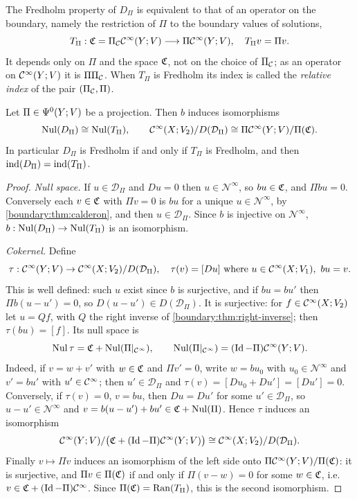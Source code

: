 The Fredholm property of $D_\Pi$ is equivalent to that of an operator on the boundary,
namely the restriction of $\Pi$ to the boundary values of solutions,
\begin{equation}\label{boundary:eq:T-Pi}
T_\Pi:\mathfrak{C}=\Pi_{\mathcal{C}}\mathcal{C}^\infty(Y;V)\longrightarrow\Pi\mathcal{C}^\infty(Y;V),\quad T_\Pi v=\Pi v.
\end{equation}
It depends only on $\Pi$ and the space $\mathfrak{C}$, not on the choice of $\Pi_{\mathcal{C}}$; as an operator
on $\mathcal{C}^\infty(Y;V)$ it is $\Pi\Pi_{\mathcal{C}}$. When $T_\Pi$ is Fredholm its index is called the
\emph{relative index} of the pair $(\Pi_{\mathcal{C}},\Pi)$.

\begin{theorem}\label{boundary:thm:fredholm-bc}
Let $\Pi\in\Psi^{0}(Y;V)$ be a projection. Then $b$ induces isomorphisms
\begin{equation*}
\operatorname{Nul}(D_\Pi)\cong\operatorname{Nul}(T_\Pi),\qquad \mathcal{C}^\infty(X;V_2)/D(\mathcal D_\Pi)\cong\Pi\mathcal{C}^\infty(Y;V)/
\Pi(\mathfrak{C}).
\end{equation*}
In particular $D_\Pi$ is Fredholm if and only if $T_\Pi$ is Fredholm, and then
$\operatorname{ind}(D_\Pi)=\operatorname{ind}(T_\Pi)$.
\end{theorem}
\begin{proof}
\emph{Null space.} If $u\in\mathcal{D}_\Pi$ and $Du=0$ then $u\in\mathcal{N}^\infty$, so
$bu\in\mathfrak{C}$, and $\Pi bu=0$. Conversely each $v\in\mathfrak{C}$ with $\Pi v=0$ is $bu$ for a
unique $u\in\mathcal{N}^\infty$, by \cref{boundary:thm:calderon}, and then $u\in
\mathcal{D}_\Pi$. Since $b$ is injective on $\mathcal{N}^\infty$, $b:\operatorname{Nul}(D_\Pi)\to
\operatorname{Nul}(T_\Pi)$ is an isomorphism.

\emph{Cokernel.} Define
\begin{equation*}
\tau:\CI(Y;V)\to\CI(X;V_2)/D(\mathcal{D}_\Pi),\quad\tau(v)=[Du]\ \text{where}\
u\in\CI(X;V_1),\ bu=v.
\end{equation*}
This is well defined: such $u$ exist since $b$ is surjective, and if $bu=bu'$ then
$\Pi b(u-u')=0$, so $D(u-u')\in D(\mathcal{D}_\Pi)$. It is surjective: for $f\in
\mathcal{C}^\infty(X;V_2)$ let $u=Qf$, with $Q$ the right inverse of \cref{boundary:thm:right-inverse};
then $\tau(bu)=[f]$. Its null space is
\begin{equation*}
\operatorname{Nul}\tau=\mathfrak{C}+\operatorname{Nul}(\Pi|_{\mathcal{C}^\infty}),\qquad \operatorname{Nul}(\Pi|_{\mathcal{C}^\infty})=(\operatorname{Id}-\Pi)\mathcal{C}^\infty(Y;V).
\end{equation*}
Indeed, if $v=w+v'$ with $w\in\mathfrak{C}$ and $\Pi v'=0$, write $w=bu_0$ with $u_0\in
\mathcal{N}^\infty$ and $v'=bu'$ with $u'\in\mathcal{C}^\infty$; then $u'\in\mathcal{D}_\Pi$ and
$\tau(v)=[Du_0+Du']=[Du']=0$. Conversely, if $\tau(v)=0$, $v=bu$, then $Du=Du'$ for some
$u'\in\mathcal{D}_\Pi$, so $u-u'\in\mathcal{N}^\infty$ and $v=b(u-u')+bu'\in\mathfrak{C}+
\operatorname{Nul}(\Pi)$. Hence $\tau$ induces an isomorphism
\begin{equation*}
\mathcal{C}^\infty(Y;V)/\big(\mathfrak{C}+(\operatorname{Id}-\Pi)\mathcal{C}^\infty(Y;V)\big)\cong\mathcal{C}^\infty(X;V_2)/D(\mathcal{D}_\Pi).
\end{equation*}
Finally $v\mapsto\Pi v$ induces an isomorphism of the left side onto $\Pi\mathcal{C}^\infty(Y;V)/
\Pi(\mathfrak{C})$: it is surjective, and $\Pi v\in\Pi(\mathfrak{C})$ if and only if $\Pi(v-w)=0$ for
some $w\in\mathfrak{C}$, i.e.\ $v\in\mathfrak{C}+(\operatorname{Id}-\Pi)\mathcal{C}^\infty$. Since $\Pi(\mathfrak{C})=\operatorname{Ran}(T_\Pi)$, this is the
second isomorphism.
\end{proof}


